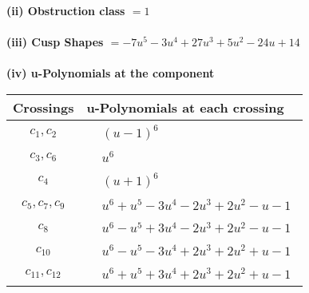 \documentclass[1p]{elsarticle_modified}
\theoremstyle{definition}
\begin{document}
\flushleft \textbf{(ii) Obstruction class $= 1$}\\~\\
\flushleft \textbf{(iii) Cusp Shapes $= -7 u^5-3 u^4+27 u^3+5 u^2-24 u+14$}\\~\\
\newpage\renewcommand{\arraystretch}{1}
\flushleft \textbf{(iv) u-Polynomials at the component}\newline \\
\begin{tabular}{m{50pt}|m{274pt}}
Crossings & \hspace{64pt}u-Polynomials at each crossing \\
\hline $$\begin{aligned}c_{1},c_{2}\end{aligned}$$&$\begin{aligned}
&(u-1)^6
\end{aligned}$\\
\hline $$\begin{aligned}c_{3},c_{6}\end{aligned}$$&$\begin{aligned}
&u^6
\end{aligned}$\\
\hline $$\begin{aligned}c_{4}\end{aligned}$$&$\begin{aligned}
&(u+1)^6
\end{aligned}$\\
\hline $$\begin{aligned}c_{5},c_{7},c_{9}\end{aligned}$$&$\begin{aligned}
&u^6+u^5-3 u^4-2 u^3+2 u^2- u-1
\end{aligned}$\\
\hline $$\begin{aligned}c_{8}\end{aligned}$$&$\begin{aligned}
&u^6- u^5+3 u^4-2 u^3+2 u^2- u-1
\end{aligned}$\\
\hline $$\begin{aligned}c_{10}\end{aligned}$$&$\begin{aligned}
&u^6- u^5-3 u^4+2 u^3+2 u^2+u-1
\end{aligned}$\\
\hline $$\begin{aligned}c_{11},c_{12}\end{aligned}$$&$\begin{aligned}
&u^6+u^5+3 u^4+2 u^3+2 u^2+u-1
\end{aligned}$\\
\hline
\end{tabular}\\~\\
\end{document}
